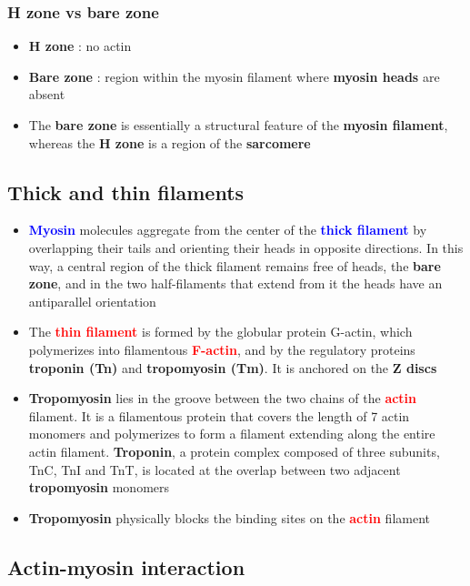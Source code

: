 \documentclass{article}
\begin{document}
\subsubsection{H zone vs bare zone}

\begin{itemize}
    \item \textbf{H zone} : no actin
    \item \textbf{Bare zone} : region within the myosin filament where \textbf{myosin heads} are absent 
    \item The \textbf{{bare zone}} is essentially a structural feature of the \textbf{{myosin filament}}, whereas the \textbf{{H zone}} is a region of the \textbf{{sarcomere}}
\end{itemize}

\subsection{Thick and thin filaments}
\begin{itemize}
    \item \textbf{\textcolor{blue}{Myosin}} molecules aggregate from the center of the \textbf{\textcolor{blue}{thick filament}} by overlapping their tails and orienting their heads in opposite directions. In this way, a central region of the thick filament remains free of heads, the \textbf{bare zone}, and in the two half-filaments that extend from it the heads have an antiparallel orientation
    \item The \textbf{\textcolor{red}{thin filament}} is formed by the globular protein G-actin, which polymerizes into filamentous \textbf{\textcolor{red}{F-actin}}, and by the regulatory proteins \textbf{troponin (Tn)} and \textbf{tropomyosin (Tm)}.  It is anchored on the \textbf{Z discs}
    \item \textbf{Tropomyosin} lies in the groove between the two chains of the \textbf{\textcolor{red}{actin}} filament. It is a filamentous protein that covers the length of 7 actin monomers and polymerizes to form a filament extending along the entire actin filament. \textbf{Troponin}, a protein complex composed of three
    subunits, TnC, TnI and TnT, is located at the overlap between two
    adjacent \textbf{tropomyosin} monomers
    \item \textbf{Tropomyosin} physically blocks the binding sites on the \textbf{\textcolor{red}{actin}} filament
\end{itemize}

\subsection{Actin-myosin interaction}
\end{document}
